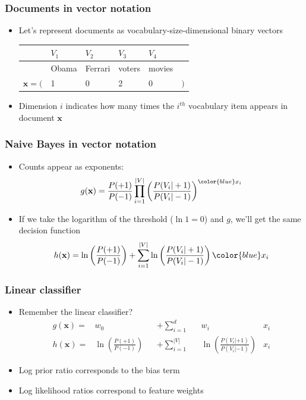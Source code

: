 \documentclass[14pt,mathserif]{beamer}
\newcommand{\x}{\mathbf{x}}
\begin{document}
\begin{frame}
  \frametitle{Documents in vector notation}
  \begin{itemize}
  \item Let's represent documents as vocabulary-size-dimensional
    binary vectors 

    \begin{tabular}{rlllll}
          &    $V_1$& $V_2$   & $V_3$   & $V_4$   & \\\hline
          & Obama   & Ferrari & voters  & movies & \\\hline
$\x = ($   & 1       & 0       & 2       & 0 & $)$\\
    \end{tabular}
  \item Dimension $i$ indicates how many times the $i^{th}$ vocabulary
    item appears in document $\x$
  \end{itemize}
\end{frame}

\begin{frame}
  \frametitle{Naive Bayes in vector notation}
  \begin{itemize}
  \item 
    Counts appear as exponents:
    \[
      g(\x) = \frac{P(+1)}{P(-1)} \prod_{i=1}^{|V|} \left(\frac{P(V_i|+1)}{P(V_i|-1)}\right)^{\color{blue} x_i}
    \]
  \item If we take the logarithm of the threshold ($\ln 1 = 0$) and
    $g$, we'll get the same decision function
    \begin{align}
      h(\x) = \ln\left(\frac{P(+1)}{P(-1)}\right) + \sum_{i=1}^{|V|} \ln\left(\frac{P(V_i|+1)}{P(V_i|-1)}\right)\color{blue}x_i
    \end{align}
  \end{itemize}
\end{frame}

\begin{frame}
  \frametitle{Linear classifier}
  \begin{itemize}
  \item Remember the linear classifier?
    \begin{align}\nonumber
      g(\x) = & w_0               &  & + \sum_{i=1}^d      && w_i 
                            & x_i \\\nonumber
      h(\x) = &  \ln\left(\frac{P(+1)}{P(-1)}\right)      &  & + \sum_{i=1}^{|V|}  &&  \ln\left(\frac{P(V_i|+1)}{P(V_i|-1)}\right)
                            & x_i 
    \end{align} 
  \item Log prior ratio corresponds to the bias term
  \item Log likelihood ratios correspond to feature weights
  \end{itemize}
\end{frame}
\end{document}
